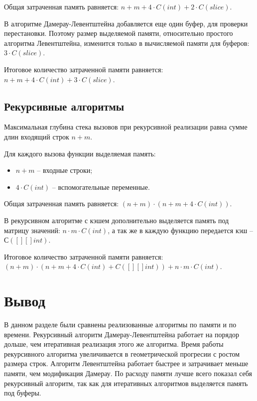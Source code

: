 Общая затраченная память равняется: $n + m + 4 \cdot C(int) + 2 \cdot C(slice)$.

В алгоритме Дамерау-Левентштейна добавляется еще один буфер, для проверки перестановки.
Поэтому размер выделяемой памяти, относительно простого алгоритма Левентштейна, изменится только в вычисляемой памяти для буферов: $3 \cdot C(slice)$.

Итоговое количество затраченной памяти равняется: $n + m + 4 \cdot C(int) + 3 \cdot C(slice)$.

\subsection{Рекурсивные алгоритмы}

Максимальная глубина стека вызовов при рекурсивной реализации равна сумме длин входящий строк $n + m$.

Для каждого вызова функции выделяемая память:
\begin{itemize}
	\item $n + m$ -- входные строки;
	\item $4 \cdot C(int) $ -- вспомогательные переменные.
\end{itemize}

Общая затраченная память равняется: $(n + m) \cdot (n + m + 4 \cdot C(int))$.

В рекурсивном алгоритме с кэшем дополнительно выделяется память под матрицу значений: $n \cdot m \cdot C(int)$, а так же в каждую функцию передается кэш -- $С([][]int)$.

Итоговое количество затраченной памяти равняется: $(n + m) \cdot (n + m + 4 \cdot C(int) + C([][]int)) + n \cdot m \cdot C(int)$.

\section*{Вывод}

В данном разделе были сравнены реализованные алгоритмы по памяти и по времени.
Рекурсивный алгоритм Дамерау-Левентштейна работает на порядор дольше, чем итеративная реализация этого же алгоритма.
Время работы рекурсивного алгоритма увеличивается в геометрической прогресии с ростом размера строк.
Алгоритм Левентштейна работает быстрее и затрачивает меньше памяти, чем модификация Дамерау.
По расходу памяти лучше всего показал себя рекурсивный алгоритм, так как для итеративных алгоритмов выделяется память под буферы.